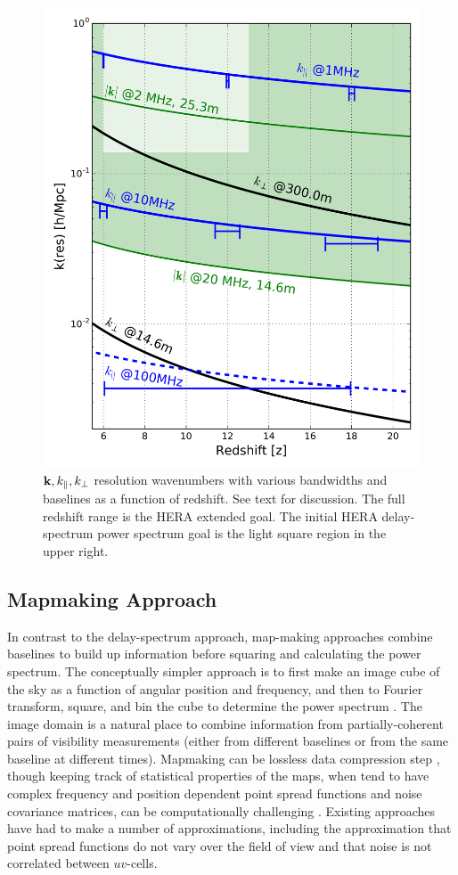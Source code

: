 \documentclass[preprint,11pt]{aastex}
\newcommand{\kvec}{{\bf k}}
\def\kperp{k_{\bot}}
\def\kpar{k_{\|}}
\begin{document}
\begin{figure}[h!]
\centerline{
\includegraphics[width=.4\textwidth]{plots/kperf.png} 
}
\caption{\small $\kvec, \kpar, \kperp$ resolution wavenumbers with various bandwidths and baselines as a function of redshift.  See text for discussion.  The full redshift range is the HERA extended goal.  The initial HERA delay-spectrum power spectrum goal is the light square region in the upper right.}
\label{fig:kperf}
\end{figure}

\subsection{Mapmaking Approach}
\label{sec:mapapproach}
In contrast to the delay-spectrum approach, map-making approaches combine baselines to build up information before squaring and calculating the power spectrum.  The conceptually simpler approach is to first make an image cube of the sky as a function of angular position and frequency, and then to Fourier transform, square, and bin the cube to determine the power spectrum \cite{liu_tegmark2011,dillon_et_al2013a}. The image domain is a natural place to combine information from partially-coherent pairs of visibility measurements (either from different baselines or from the same baseline at different times). Mapmaking can be lossless data compression step \citep{tegmark1997b}, though keeping track of statistical properties of the maps, when tend to have complex frequency and position dependent point spread functions and noise covariance matrices, can be computationally challenging \citep{dillon_et_al2015a}. Existing approaches have had to make a number of approximations, including the approximation that point spread functions do not vary over the field of view and that noise is not correlated between $uv$-cells.

\end{document}
